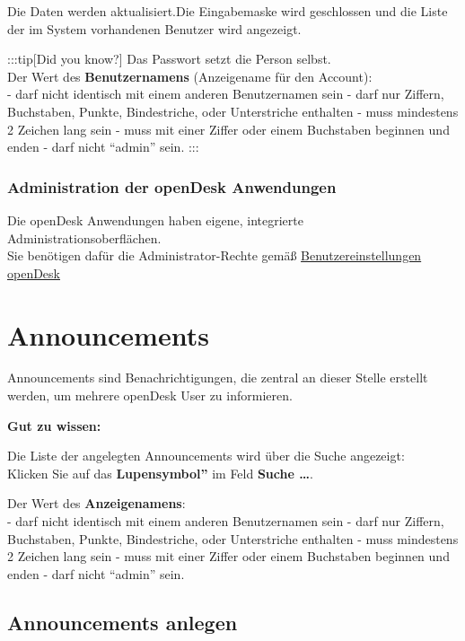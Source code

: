 \documentclass[
  letterpaper,
  DIV=11,
  numbers=noendperiod]{scrreprt}
\begin{document}
Die Daten werden aktualisiert.Die Eingabemaske wird geschlossen und die
Liste der im System vorhandenen Benutzer wird angezeigt.

:::tip{[}Did you know?{]} Das Passwort setzt die Person selbst.\\
Der Wert des \textbf{Benutzernamens} (Anzeigename für den Account):\\
- darf nicht identisch mit einem anderen Benutzernamen sein - darf nur
Ziffern, Buchstaben, Punkte, Bindestriche, oder Unterstriche enthalten -
muss mindestens 2 Zeichen lang sein - muss mit einer Ziffer oder einem
Buchstaben beginnen und enden - darf nicht ``admin'' sein. :::

\subsection{Administration der openDesk
Anwendungen}\label{administration-der-opendesk-anwendungen}

Die openDesk Anwendungen haben eigene, integrierte
Administrationsoberflächen.\\
Sie benötigen dafür die Administrator-Rechte gemäß
\href{benutzerrechte}{Benutzereinstellungen openDesk}

\chapter{Announcements}\label{announcements}

Announcements sind Benachrichtigungen, die zentral an dieser Stelle
erstellt werden, um mehrere openDesk User zu informieren.

\textbf{Gut zu wissen:}

Die Liste der angelegten Announcements wird über die Suche angezeigt:\\
Klicken Sie auf das \textbf{Lupensymbol''} im Feld \textbf{Suche
\ldots{}}.

Der Wert des \textbf{Anzeigenamens}:\\
- darf nicht identisch mit einem anderen Benutzernamen sein - darf nur
Ziffern, Buchstaben, Punkte, Bindestriche, oder Unterstriche enthalten -
muss mindestens 2 Zeichen lang sein - muss mit einer Ziffer oder einem
Buchstaben beginnen und enden - darf nicht ``admin'' sein.

\section{Announcements anlegen}\label{announcements-anlegen}
\end{document}
